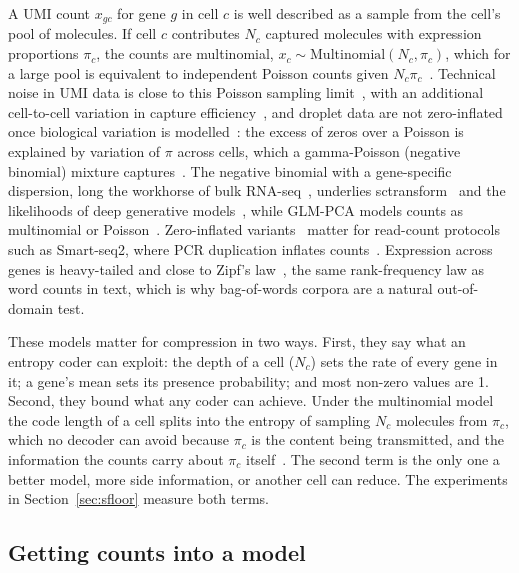 A UMI count $x_{gc}$ for gene $g$ in cell $c$ is well described as a sample from the cell's pool of molecules. If cell
$c$ contributes $N_c$ captured molecules with expression proportions $\pi_c$, the counts are multinomial,
$x_c \sim \mathrm{Multinomial}(N_c, \pi_c)$, which for a large pool is equivalent to independent Poisson counts given
$N_c\pi_c$~\cite{townes2019feature}. Technical noise in UMI data is close to this Poisson sampling
limit~\cite{kim2020demystifying,townes2019feature,sarkar2021separating}, with an additional cell-to-cell variation in
capture efficiency~\cite{grun2014validation}, and droplet data are not zero-inflated once biological variation is
modelled~\cite{svensson2020droplet,kim2020demystifying}: the excess of zeros over a Poisson is explained by variation of
$\pi$ across cells, which a gamma-Poisson (negative binomial) mixture captures~\cite{svensson2020droplet,choudhary2022comparison}.
The negative binomial with a gene-specific dispersion, long the workhorse of bulk
RNA-seq~\cite{robinson2010edger,love2014moderated}, underlies sctransform~\cite{hafemeister2019normalization} and the
likelihoods of deep generative models~\cite{lopez2018deep,eraslan2019single}, while GLM-PCA models counts as multinomial
or Poisson~\cite{townes2019feature}. Zero-inflated variants~\cite{risso2018general} matter for read-count protocols such
as Smart-seq2, where PCR duplication inflates counts~\cite{townes2019feature}.
Expression across genes is heavy-tailed and close to Zipf's law~\cite{furusawa2003zipf}, the same rank-frequency
law as word counts in text, which is why bag-of-words corpora are a natural out-of-domain test.

These models matter for compression in two ways. First, they say what an entropy coder can exploit: the depth of a cell
($N_c$) sets the rate of every gene in it; a gene's mean sets its presence probability; and most non-zero values are 1.
Second, they bound what any coder can achieve. Under the multinomial model the code length of a cell splits into
the entropy of sampling $N_c$ molecules from $\pi_c$, which no decoder can avoid because $\pi_c$ is the content being
transmitted, and the information the counts carry about $\pi_c$ itself~\cite{cover2006elements}. The second term is the
only one a better model, more side information, or another cell can reduce. The experiments in
Section~\ref{sec:sfloor} measure both terms.

\subsection{Getting counts into a model}

